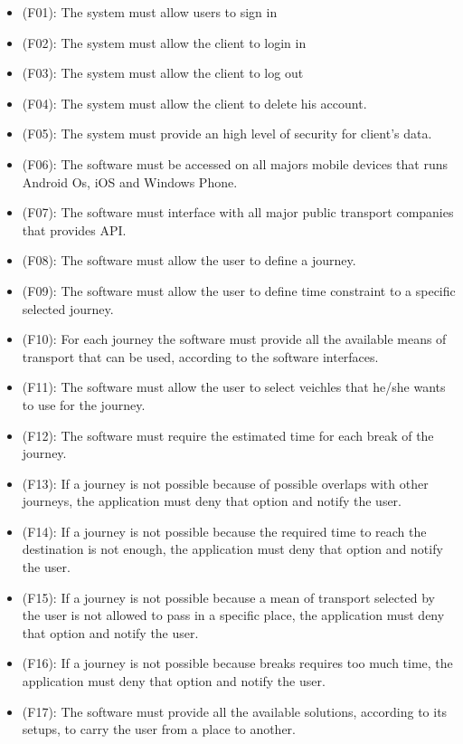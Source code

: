 \documentclass[a4paper,leqno]{book}
\begin{document}
\begin{itemize}

\item (F01): The system must allow users to sign in
\item (F02): The system must allow the client to login in
\item (F03): The system must allow the client to log out
\item (F04): The system must allow the client to delete his account.
\item (F05): The system must provide an high level of security for client's data.
\item (F06): The software must be accessed on all majors mobile devices that runs Android Os, iOS and Windows Phone.
\item (F07): The software must interface with all major public transport companies that provides API.
\item (F08): The software must allow the user to define a journey.
\item (F09): The software must allow the user to define time constraint to a specific selected journey.
\item (F10): For each journey the software must provide all the available means of transport that can be used, according to the software interfaces.
\item (F11): The software must allow the user to select veichles that he/she wants to use for the journey.
\item (F12): The software must require the estimated time for each break of the journey.
\item (F13): If a journey is not possible because of possible overlaps with other journeys, the application must deny that option and notify the user.
\item (F14): If a journey is not possible because the required time to reach the destination is not enough, the application must deny that option and notify the user.
\item (F15): If a journey is not possible because a mean of transport selected by the user is not allowed to pass in a specific place, the application must deny that option and notify the user.
\item (F16): If a journey is not possible because breaks requires too much time, the application must deny that option and notify the user.
\item (F17): The software must provide all the available solutions, according to its setups, to carry the user from a place to another.

\end{itemize}
\end{document}
